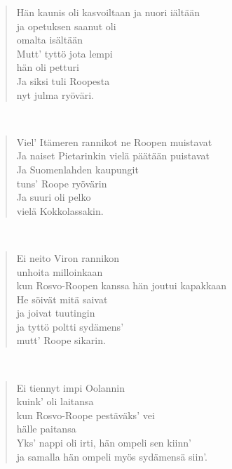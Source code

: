 \noindent\begin{minipage}{\linewidth}
\begin{verse}
	Hän kaunis oli kasvoiltaan ja nuori iältään\\
	ja opetuksen saanut oli\\
	omalta isältään\\
	Mutt' tyttö jota lempi\\
	hän oli petturi\\
	Ja siksi tuli Roopesta\\
	nyt julma ryöväri.\\
\end{verse}
\end{minipage}\\[10pt]
\noindent\begin{minipage}{\linewidth}
\begin{verse}
	Viel' Itämeren rannikot ne Roopen muistavat\\
	Ja naiset Pietarinkin vielä päätään puistavat\\
	Ja Suomenlahden kaupungit\\
	tuns' Roope ryövärin\\
	Ja suuri oli pelko\\
	vielä Kokkolassakin.\\
\end{verse}
\end{minipage}\\[10pt]
\noindent\begin{minipage}{\linewidth}
\begin{verse}
	Ei neito Viron rannikon\\
	unhoita milloinkaan\\
	kun Rosvo-Roopen kanssa hän joutui kapakkaan\\
	He söivät mitä saivat\\
	ja joivat tuutingin\\
	ja tyttö poltti sydämens'\\
	mutt' Roope sikarin.\\
\end{verse}
\end{minipage}\\[10pt]
\noindent\begin{minipage}{\linewidth}
\begin{verse}
	Ei tiennyt impi Oolannin\\
	kuink' oli laitansa\\
	kun Rosvo-Roope pestäväks' vei\\
	hälle paitansa\\
	Yks' nappi oli irti, hän ompeli sen kiinn'\\
	ja samalla hän ompeli myös sydämensä siin'.\\
\end{verse}
\end{minipage}\\[10pt]
